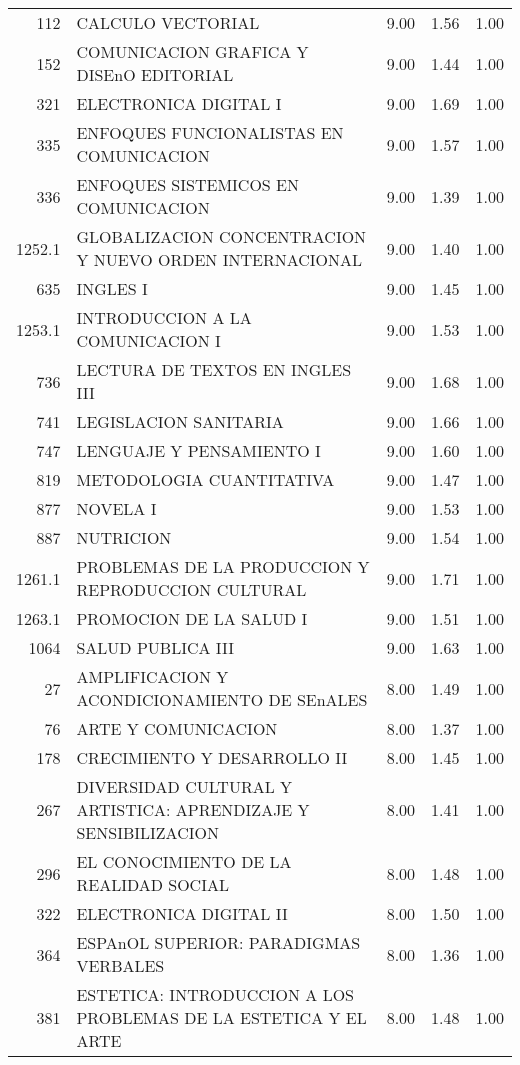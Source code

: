 \documentclass[12pt]{article}
\begin{document}
\begin{table}[ht]
\begin{tabular}{rlrrr}
  112 & CALCULO VECTORIAL & 9.00 & 1.56 & 1.00 \\ 
  152 & COMUNICACION GRAFICA Y DISEnO EDITORIAL & 9.00 & 1.44 & 1.00 \\ 
  321 & ELECTRONICA DIGITAL I & 9.00 & 1.69 & 1.00 \\ 
  335 & ENFOQUES FUNCIONALISTAS EN COMUNICACION & 9.00 & 1.57 & 1.00 \\ 
  336 & ENFOQUES SISTEMICOS EN COMUNICACION & 9.00 & 1.39 & 1.00 \\ 
  1252.1 & GLOBALIZACION CONCENTRACION Y NUEVO ORDEN INTERNACIONAL & 9.00 & 1.40 & 1.00 \\ 
  635 & INGLES I & 9.00 & 1.45 & 1.00 \\ 
  1253.1 & INTRODUCCION A LA COMUNICACION I & 9.00 & 1.53 & 1.00 \\ 
  736 & LECTURA DE TEXTOS EN INGLES III & 9.00 & 1.68 & 1.00 \\ 
  741 & LEGISLACION SANITARIA & 9.00 & 1.66 & 1.00 \\ 
  747 & LENGUAJE Y PENSAMIENTO I & 9.00 & 1.60 & 1.00 \\ 
  819 & METODOLOGIA CUANTITATIVA & 9.00 & 1.47 & 1.00 \\ 
  877 & NOVELA I & 9.00 & 1.53 & 1.00 \\ 
  887 & NUTRICION & 9.00 & 1.54 & 1.00 \\ 
  1261.1 & PROBLEMAS DE LA PRODUCCION Y REPRODUCCION CULTURAL & 9.00 & 1.71 & 1.00 \\ 
  1263.1 & PROMOCION DE LA SALUD I & 9.00 & 1.51 & 1.00 \\ 
  1064 & SALUD PUBLICA III & 9.00 & 1.63 & 1.00 \\ 
  27 & AMPLIFICACION Y ACONDICIONAMIENTO DE SEnALES & 8.00 & 1.49 & 1.00 \\ 
  76 & ARTE Y COMUNICACION & 8.00 & 1.37 & 1.00 \\ 
  178 & CRECIMIENTO Y DESARROLLO II & 8.00 & 1.45 & 1.00 \\ 
  267 & DIVERSIDAD CULTURAL Y ARTISTICA: APRENDIZAJE Y SENSIBILIZACION & 8.00 & 1.41 & 1.00 \\ 
  296 & EL CONOCIMIENTO DE LA REALIDAD SOCIAL & 8.00 & 1.48 & 1.00 \\ 
  322 & ELECTRONICA DIGITAL II & 8.00 & 1.50 & 1.00 \\ 
  364 & ESPAnOL SUPERIOR: PARADIGMAS VERBALES & 8.00 & 1.36 & 1.00 \\ 
  381 & ESTETICA: INTRODUCCION A LOS PROBLEMAS DE LA ESTETICA Y EL ARTE & 8.00 & 1.48 & 1.00 \\ 

\end{tabular}
\end{table}
\end{document}
